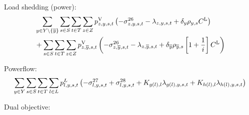 \documentclass{article}
\begin{document}
Load shedding (power):
\begin{align}
	& \sum\limits_{\iYear \in \sYears 
		\setminus \{\iYearTerminal\}
	} \sum\limits_{\iScenario \in \sScenarios} \sum\limits_{\iInterval \in \sIntervals} \sum\limits_{\iZone \in \sZones} \vLostLoadPower \left(- \dNonNegativeLostLoad - \dPowerBalance + \cDiscountRate \cScenarioDuration \cLostLoadCost\right)\\
	& + \sum\limits_{\iScenario \in \sScenarios} \sum\limits_{\iInterval \in \sIntervals} \sum\limits_{\iZone \in \sZones} \vLostLoadPower[\iZone,\iYearTerminal,\iScenario,\iInterval] \left(- \dNonNegativeLostLoad[\iZone,\iYearTerminal,\iScenario,\iInterval] - \dPowerBalance[\iZone,\iYearTerminal,\iScenario,\iInterval] + \cDiscountRate[\iYearTerminal] \cScenarioDuration[\iYearTerminal,\iScenario] \left[1 + \frac{1}{\cInterestRate}\right] \cLostLoadCost\right)\\
\end{align}


Powerflow:
\begin{equation}
	\sumIntervals \sum\limits_{\iLink \in \sLinks} \vPowerFlow \left(-\dMinPowerFlow + \dMaxPowerFlow + \cIncidenceMatrix[g(\iLink), \iLink] \dPowerBalance[g(\iLink),\iYear,\iScenario,\iInterval] + \cIncidenceMatrix[h(\iLink), \iLink] \dPowerBalance[h(\iLink),\iYear,\iScenario,\iInterval]\right)
\end{equation}

Dual objective:
\end{document}
